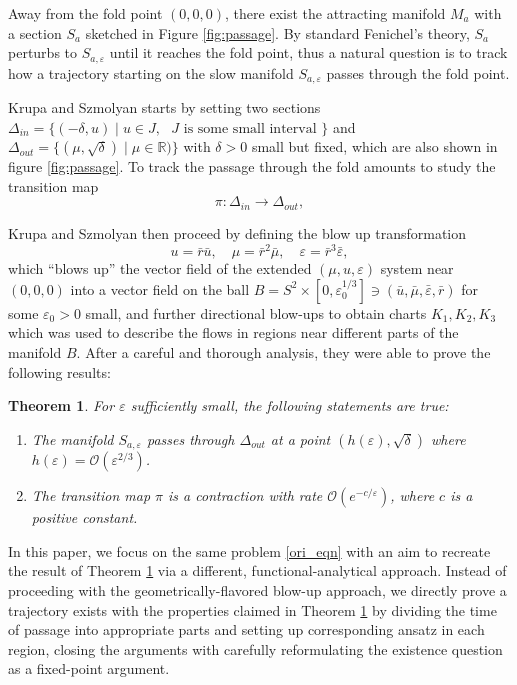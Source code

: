 \documentclass[letterpaper,11pt]{article}
\newcommand{\rmO}{\mathcal{O}}
\newcommand{\eps}{\varepsilon}
\numberwithin{equation}{section}
\theoremstyle{plain}
\newtheorem{theorem}{Theorem}[section]
\begin{document}
 Away from the fold point $(0,0,0)$, there exist the attracting manifold $M_a$ with a section $S_a$ sketched in Figure \ref{fig:passage}. By standard Fenichel's theory, $S_a$ perturbs to $S_{a,\eps}$ until it reaches the fold point, thus a natural question is to track how a trajectory starting on the slow manifold $S_{a,\eps}$ passes through the fold point.

Krupa and Szmolyan starts by setting two sections $\Delta_{in} = \{(-\delta, u) \mid u\in J,\text{ $J$ is some small interval }\}$ and $\Delta_{out} = \{( \mu ,\sqrt{\delta})\mid \mu \in \mathbb{R})\}$ with $\delta>0$ small but fixed, which are also shown in figure \ref{fig:passage}. To track the passage through the fold amounts to study the transition map 
\[
\pi: \Delta_{in} \to \Delta_{out},
\]

Krupa and Szmolyan then proceed by defining the blow up transformation
\[
u =\bar{r} \bar{u},  \quad \mu = \bar{r}^2 \bar{\mu}, \quad  \eps = \bar{r}^3 \bar{\eps},
\]
which ``blows up'' the vector field of the extended $(\mu, u, \eps)$ system near $(0,0,0)$ into a vector field on the ball $B = S^2 \times [0,\eps_0^{1/3}] \ni (\bar{u}, \bar{\mu}, \bar{\eps}, \bar{r})$ for some $\eps_0>0$ small, and further directional blow-ups to obtain charts $K_1,K_2,K_3$ which was used to describe the flows in regions near different parts of the manifold $B$. After a careful and thorough analysis, they were able to prove the following results:
\begin{theorem}\label{ks_main}
For $\eps$ sufficiently small, the following statements are true:
\begin{enumerate}
\item The manifold $S_{a,\eps} $ passes through  $\Delta_{out}$ at a point $(h(\eps), \sqrt{\delta})$ where $h(\eps) = \rmO(\eps^{2/3})$.
\item The transition map $\pi$ is a contraction with rate $\rmO(e^{-c/\eps} )$, where $c$ is a positive constant.
\end{enumerate}
\end{theorem}


In this paper, we focus on the same problem \eqref{ori_eqn} with an aim to recreate the result of Theorem \ref{ks_main} via a different, functional-analytical approach. Instead of proceeding with the geometrically-flavored blow-up approach, we directly prove a trajectory exists with the properties claimed in Theorem \ref{ks_main} by dividing the time of passage into appropriate parts and setting up corresponding ansatz in each region, closing the arguments with carefully reformulating the existence question as a fixed-point argument.
\end{document}
